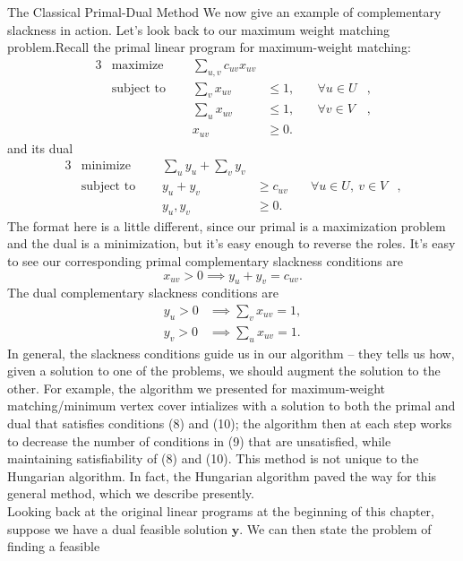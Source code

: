 \begin{section}{The Classical Primal-Dual Method}
	We now give an example of complementary slackness in action. Let's look back to our maximum 
	weight matching problem.Recall the primal linear program for maximum-weight matching:
	\begin{alignat}{3}
		& \text{maximize } & \sum_{u,v} c_{uv} x_{uv}& \\
		& \text{subject to } \quad & \sum_{v} x_{uv} & \leq 1, & \quad \forall u\in U&, \\
				     &\quad & \sum_{u} x_{uv} & \leq 1, & \quad \forall v\in V &, \\
				&& x_{uv} & \geq 0.
	\end{alignat}
	and its dual
	\begin{alignat}{3}
		& \text{minimize } & \sum_u y_u + \sum_v y_v& \\
		& \text{subject to } \quad & y_u + y_v & \geq c_{uv} & \quad \forall 
					u\in U,\ v\in V &, \\
				    && y_u,y_v & \geq 0.
	\end{alignat}
	The format here is a little different, since our primal is a maximization problem and the dual 
	is a minimization, but it's easy enough to reverse the roles. It's easy to see our 
	corresponding primal complementary slackness conditions are
	\begin{equation}
		x_{uv} > 0 \implies y_u + y_v = c_{uv}.
	\end{equation}
	The dual complementary slackness conditions are
	\begin{align}
		y_u > 0 &\implies \sum_v x_{uv} = 1,\\
		y_v > 0 &\implies \sum_u x_{uv} = 1.
	\end{align}
	In general, the slackness conditions guide us in our algorithm -- they tells us how, given a 
	solution to one of the problems, we should augment the solution to the other. For example, the 
	algorithm we presented for maximum-weight matching/minimum vertex cover intializes with 
	a solution to both the primal and dual that satisfies conditions (8) and (10); the algorithm 
	then at each step works to decrease the number of conditions in (9) that are unsatisfied, while 
	maintaining satisfiability of (8) and (10). This method is not unique to the Hungarian 
	algorithm. In fact, the Hungarian algorithm paved the way for this general method, which we 
	describe presently.\\
	Looking back at the original linear programs at the beginning of this chapter, suppose we have 
	a dual feasible solution $\mathbf{y}$. We can then state the problem of finding a feasible 

\end{section}
